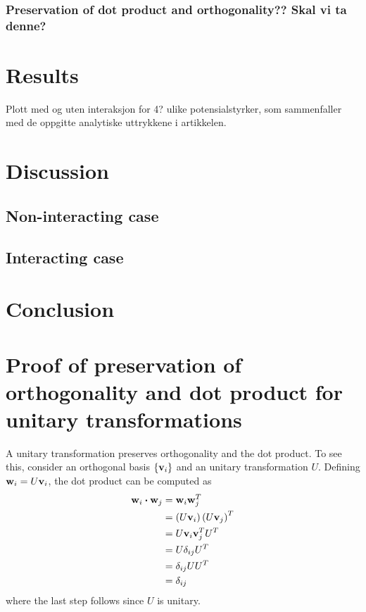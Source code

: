 \documentclass[aps,reprint]{revtex4-1}
\newcommand\blankpage{%
  \null
  \thispagestyle{empty}%
  \addtocounter{page}{-1}%
  \newpage}
\begin{document}
\subsubsection{Preservation of dot product and orthogonality?? Skal vi ta denne?}
\section{Results}
\label{sec:results}
Plott med og uten interaksjon for 4? ulike potensialstyrker, som sammenfaller
med de oppgitte analytiske uttrykkene i artikkelen.
\section{Discussion}
\subsection{Non-interacting case}
\subsection{Interacting case}
\label{sec:discussion}
\section{Conclusion}
\label{sec:conclusion}

\blankpage
\appendix
\section{Proof of preservation of orthogonality and dot product for unitary transformations}
A unitary transformation preserves orthogonality and the dot product. To see
this, consider an orthogonal basis \(\{\vb{v}_{i}\}\) and an unitary
transformation \(U\). Defining \(\vb{w}_{i}=U\vb{v}_{i}\), the dot product can
be computed as
\begin{align*}
  \vb{w}_{i}\vdot \vb{w}_{j} &= \vb{w}_{i}\vb{w}_{j}^{T}\\
                             &= \left( U\vb{v}_{i} \right)\left( U\vb{v}_{j} \right)^{T}\\
                             &= U\vb{v}_{i}\vb{v}_{j}^{T}U^{T}\\
                             &= U\delta_{ij}U^{T}\\
                             &= \delta_{ij}UU^{T}\\
                             &= \delta_{ij}
\end{align*}
where the last step follows since \(U\) is unitary.
\blankpage
\end{document}
